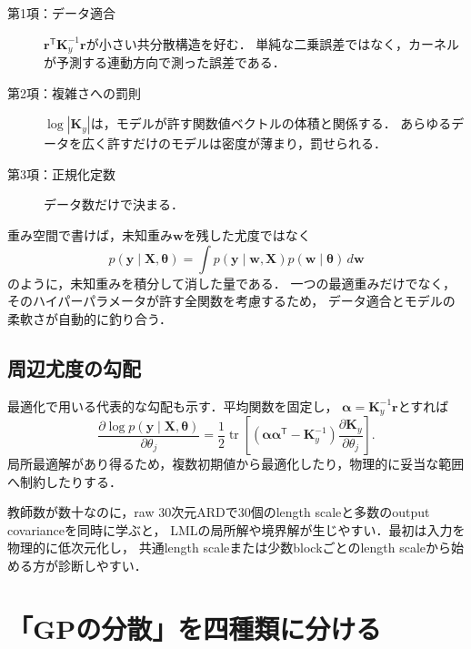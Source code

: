 \documentclass[a4paper,11pt]{ltjsarticle}
\newcommand{\T}{\mathsf T}
\newcommand{\tr}{\operatorname{tr}}
\begin{document}
\begin{description}
  \item[第1項：データ適合] \(\bm r^\T\bm K_y^{-1}\bm r\)が小さい共分散構造を好む．
  単純な二乗誤差ではなく，カーネルが予測する連動方向で測った誤差である．
  \item[第2項：複雑さへの罰則] \(\log|\bm K_y|\)は，モデルが許す関数値ベクトルの体積と関係する．
  あらゆるデータを広く許すだけのモデルは密度が薄まり，罰せられる．
  \item[第3項：正規化定数] データ数だけで決まる．
\end{description}

\begin{intuitionbox}[なぜ「周辺」尤度か]
重み空間で書けば，未知重み\(\bm w\)を残した尤度ではなく
\begin{equation}
  p(\bm y\mid\bm X,\bm\theta)
  =\int p(\bm y\mid\bm w,\bm X)p(\bm w\mid\bm\theta)\,d\bm w
\end{equation}
のように，未知重みを積分して消した量である．
一つの最適重みだけでなく，そのハイパーパラメータが許す全関数を考慮するため，
データ適合とモデルの柔軟さが自動的に釣り合う．
\end{intuitionbox}

\subsection{周辺尤度の勾配}

最適化で用いる代表的な勾配も示す．平均関数を固定し，
\(\bm\alpha=\bm K_y^{-1}\bm r\)とすれば
\begin{equation}
  \frac{\partial\log p(\bm y\mid\bm X,\bm\theta)}{\partial\theta_j}
  =\frac12\tr\left[
  \left(\bm\alpha\bm\alpha^\T-\bm K_y^{-1}\right)
  \frac{\partial\bm K_y}{\partial\theta_j}
  \right].
  \label{eq:lml-gradient}
\end{equation}
局所最適解があり得るため，複数初期値から最適化したり，物理的に妥当な範囲へ制約したりする．

\begin{cautionbox}[小標本での過剰なハイパーパラメータ]
教師数が数十なのに，raw 30次元ARDで30個のlength scaleと多数のoutput covarianceを同時に学ぶと，
LMLの局所解や境界解が生じやすい．最初は入力を物理的に低次元化し，
共通length scaleまたは少数blockごとのlength scaleから始める方が診断しやすい．
\end{cautionbox}

\section{「GPの分散」を四種類に分ける}
\label{sec:variance-taxonomy}
\end{document}
